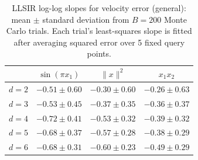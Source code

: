 \begin{table}[htbp]
\small
\centering
\begin{tabular}{lccc}
\toprule
 & $\sin(\pi x_1)$ & $\|x\|^2$ & $x_1x_2$ \\
\midrule
$d=2$ & $-0.51 \pm 0.60$ & $-0.30 \pm 0.60$ & $-0.26 \pm 0.63$ \\
$d=3$ & $-0.53 \pm 0.45$ & $-0.37 \pm 0.35$ & $-0.36 \pm 0.37$ \\
$d=4$ & $-0.72 \pm 0.41$ & $-0.53 \pm 0.32$ & $-0.39 \pm 0.32$ \\
$d=5$ & $-0.68 \pm 0.37$ & $-0.57 \pm 0.28$ & $-0.38 \pm 0.29$ \\
$d=6$ & $-0.68 \pm 0.31$ & $-0.60 \pm 0.23$ & $-0.49 \pm 0.29$ \\
\bottomrule
\end{tabular}
\caption{LLSIR log-log slopes for velocity error (general): mean $\pm$ standard deviation from $B=200$ Monte Carlo trials. Each trial's least-squares slope is fitted after averaging squared error over 5 fixed query points. }
\label{tab:vel-general}
\end{table}

